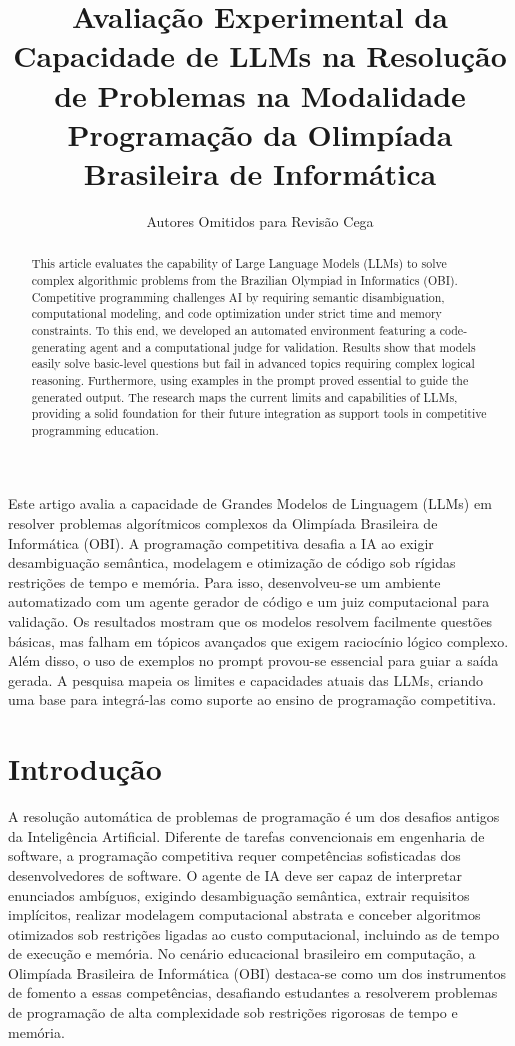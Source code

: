 \documentclass[12pt]{article}
\title{Avaliação Experimental da Capacidade de LLMs na Resolução de Problemas na Modalidade Programação da Olimpíada Brasileira de Informática}
\author{Autores Omitidos para Revisão Cega}
\begin{document}
\maketitle

\begin{abstract}
This article evaluates the capability of Large Language Models (LLMs) to solve complex algorithmic problems from the Brazilian Olympiad in Informatics (OBI). Competitive programming challenges AI by requiring semantic disambiguation, computational modeling, and code optimization under strict time and memory constraints. To this end, we developed an automated environment featuring a code-generating agent and a computational judge for validation. Results show that models easily solve basic-level questions but fail in advanced topics requiring complex logical reasoning. Furthermore, using examples in the prompt proved essential to guide the generated output. The research maps the current limits and capabilities of LLMs, providing a solid foundation for their future integration as support tools in competitive programming education.
\end{abstract}
     
\begin{resumo}
Este artigo avalia a capacidade de Grandes Modelos de Linguagem (LLMs) em resolver problemas algorítmicos complexos da Olimpíada Brasileira de Informática (OBI). A programação competitiva desafia a IA ao exigir desambiguação semântica, modelagem e otimização de código sob rígidas restrições de tempo e memória. Para isso, desenvolveu-se um ambiente automatizado com um agente gerador de código e um juiz computacional para validação. Os resultados mostram que os modelos resolvem facilmente questões básicas, mas falham em tópicos avançados que exigem raciocínio lógico complexo. Além disso, o uso de exemplos no prompt provou-se essencial para guiar a saída gerada. A pesquisa mapeia os limites e capacidades atuais das LLMs, criando uma base para integrá-las como suporte ao ensino de programação competitiva.
\end{resumo}

\section{Introdução}

A resolução automática de problemas de programação é um dos desafios antigos da Inteligência Artificial. Diferente de tarefas convencionais em engenharia de software, a programação competitiva requer competências sofisticadas dos desenvolvedores de software. O agente de IA deve ser capaz de interpretar enunciados ambíguos, exigindo desambiguação semântica, extrair requisitos implícitos, realizar modelagem computacional abstrata e conceber algoritmos otimizados sob restrições ligadas ao custo computacional, incluindo as de tempo de execução e memória. No cenário educacional brasileiro em computação, a Olimpíada Brasileira de Informática (OBI) destaca-se como um dos instrumentos de fomento a essas competências, desafiando estudantes a resolverem problemas de programação de alta complexidade sob restrições rigorosas de tempo e memória.
\end{document}
